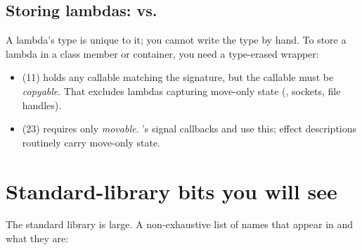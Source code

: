 \subsection{Storing lambdas:  vs.\ }

A lambda's type is unique to it; you cannot write the type by hand.
To store a lambda in a class member or container, you need a
type-erased wrapper:

\begin{itemize}[leftmargin=*]
  \item {} (\cpp{}11) holds any
    callable matching the signature, but the callable must be
    \emph{copyable}. That excludes lambdas capturing move-only state
    (, sockets, file handles).
  \item {} (\cpp{}23)
    requires only \emph{movable}. \maya{}'s signal callbacks and
     use this; effect descriptions routinely
    carry move-only state.
\end{itemize}

\section{Standard-library bits you will see}
\label{sec:cpp:stdlib}

The standard library is large. A non-exhaustive list of names that
appear in \maya{} and what they are:

